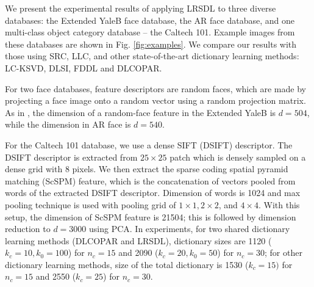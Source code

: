 \documentclass[letterpaper]{article}
\begin{document}
We present the experimental results of applying LRSDL to three diverse databases: the Extended YaleB face database\cite{georghiades2001few}, the AR face database\cite{ardataset}, and one multi-class object category database -- the Caltech 101\cite{fei2007learning}. Example images from these databases are shown in Fig. \ref{fig:examples}.
We compare our results with those using SRC\cite{qi2012robust}, LLC\cite{song2015locality}, and other state-of-the-art dictionary learning methods: LC-KSVD\cite{Zhuolin2013LCKSVD}, DLSI\cite{ramirez2010classification}, FDDL\cite{Meng2011FDDL} and DLCOPAR\cite{kong2012dictionary}.
\par
For two face databases, feature descriptors are random faces, which are made by projecting a face image onto a random vector using a random projection matrix. As in \cite{zhang2010discriminative}, the dimension of a random-face feature in  the Extended YaleB is $d= 504$, while the dimension in AR face is $d = 540$.
\par For the Caltech 101 database, we use a dense SIFT (DSIFT) descriptor. The DSIFT descriptor is extracted from $25\times 25$ patch which is densely sampled on a dense grid with 8 pixels. We then extract the sparse coding spatial pyramid matching (ScSPM) feature\cite{yang2009linear}, which is the concatenation of vectors pooled from words of the extracted DSIFT descriptor. Dimension of words is 1024 and max pooling technique is used with pooling grid of $1\times 1, 2 \times 2$, and $4 \times 4$. With this setup, the dimension of ScSPM feature is 21504; this is followed by dimension reduction to $d = 3000$ using PCA. In experiments, for two shared dictionary learning methods (DLCOPAR\cite{kong2012dictionary} and LRSDL), dictionary sizes are 1120 ($k_c=10,k_0 = 100$) for $n_c = 15$ and 2090 ($k_c = 20, k_0 = 50$) for $n_c = 30$; for other dictionary learning methods, size of the total dictionary is 1530 ($k_c = 15)$ for $n_c = 15$ and 2550 ($k_c = 25$) for $n_c = 30$.

\end{document}
